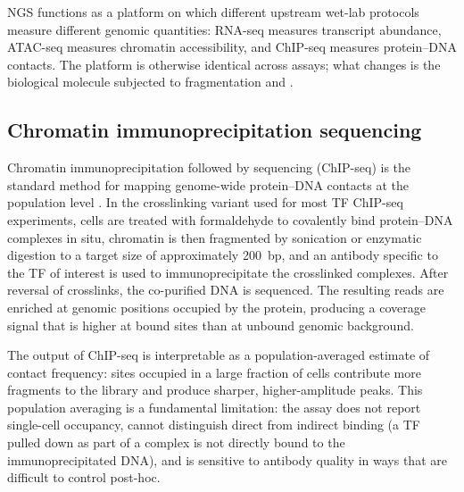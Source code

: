 NGS functions as a platform on which different upstream wet-lab protocols measure different genomic quantities:
RNA-seq measures transcript abundance, ATAC-seq measures chromatin accessibility, and ChIP-seq measures protein--DNA contacts.
The platform is otherwise identical across assays; what changes is the biological molecule subjected to fragmentation and .

\subsection{Chromatin immunoprecipitation sequencing}

Chromatin immunoprecipitation followed by sequencing (ChIP-seq) is the standard method for mapping genome-wide protein--DNA contacts at the population level \cite{baileyPracticalGuidelinesComprehensive2013}.
In the crosslinking variant used for most TF ChIP-seq experiments, cells are treated with formaldehyde to covalently bind protein--DNA complexes in situ, chromatin is then fragmented by sonication or enzymatic digestion to a target size of approximately 200~bp, and an antibody specific to the TF of interest is used to immunoprecipitate the crosslinked complexes.
After reversal of crosslinks, the co-purified DNA is sequenced.
The resulting reads are enriched at genomic positions occupied by the protein, producing a coverage signal that is higher at bound sites than at unbound genomic background.

The output of ChIP-seq is interpretable as a population-averaged estimate of contact frequency:
sites occupied in a large fraction of cells contribute more fragments to the library and produce sharper, higher-amplitude peaks.
This population averaging is a fundamental limitation: the assay does not report single-cell occupancy, cannot distinguish direct from indirect binding (a TF pulled down as part of a complex is not directly bound to the immunoprecipitated DNA), and is sensitive to antibody quality in ways that are difficult to control post-hoc.




